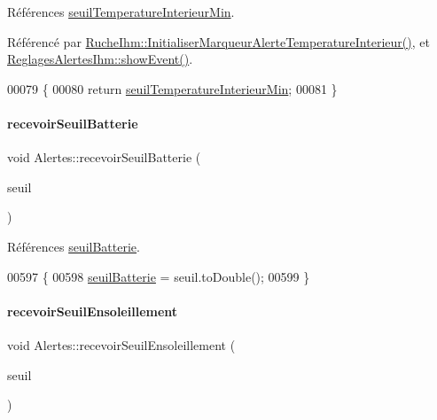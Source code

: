 Références \hyperlink{class_alertes_a1c970252300a177bef641ca5399d3783}{seuil\+Temperature\+Interieur\+Min}.



Référencé par \hyperlink{class_ruche_ihm_a0f44cb030202047fa9a364dfcbf9a13f}{Ruche\+Ihm\+::\+Initialiser\+Marqueur\+Alerte\+Temperature\+Interieur()}, et \hyperlink{class_reglages_alertes_ihm_af47504b34ab0213fce9269c08b9e5544}{Reglages\+Alertes\+Ihm\+::show\+Event()}.


\begin{DoxyCode}
00079 \{
00080     \textcolor{keywordflow}{return} \hyperlink{class_alertes_a1c970252300a177bef641ca5399d3783}{seuilTemperatureInterieurMin};
00081 \}
\end{DoxyCode}
\mbox{\label{class_alertes_a61e1f4a105bd64ac829959726ae6ebb8}} 
\paragraph{\texorpdfstring{recevoir\+Seuil\+Batterie}{recevoirSeuilBatterie}}
{\footnotesize\ttfamily void Alertes\+::recevoir\+Seuil\+Batterie (\begin{DoxyParamCaption}\item[{Q\+String}]{seuil }\end{DoxyParamCaption})\hspace{0.3cm}{\ttfamily [slot]}}



Références \hyperlink{class_alertes_a3ac4e5d2b1a8fdd9cf4633861948110f}{seuil\+Batterie}.


\begin{DoxyCode}
00597 \{
00598     \hyperlink{class_alertes_a3ac4e5d2b1a8fdd9cf4633861948110f}{seuilBatterie} = seuil.toDouble();
00599 \}
\end{DoxyCode}
\mbox{\label{class_alertes_abf6b9934820f50024c50dc9691f4ddee}} 
\paragraph{\texorpdfstring{recevoir\+Seuil\+Ensoleillement}{recevoirSeuilEnsoleillement}}
{\footnotesize\ttfamily void Alertes\+::recevoir\+Seuil\+Ensoleillement (\begin{DoxyParamCaption}\item[{Q\+String}]{seuil }\end{DoxyParamCaption})\hspace{0.3cm}{\ttfamily [slot]}}



